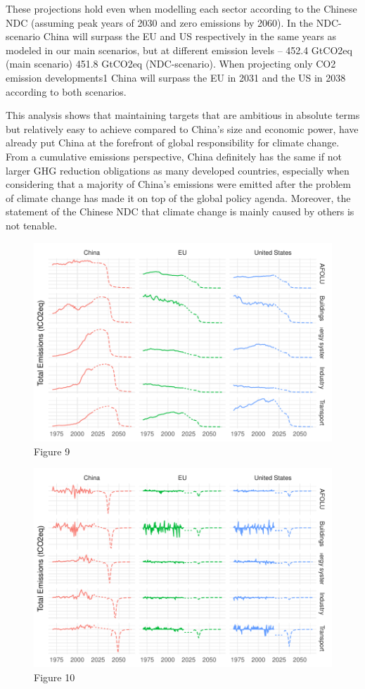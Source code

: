 \documentclass[
  12pt,
]{article}
\numberwithin{equation}{section}
\numberwithin{table}{section}
\numberwithin{figure}{section}
\begin{document}
These projections hold even when modelling each sector according to the
Chinese NDC (assuming peak years of 2030 and zero emissions by 2060). In
the NDC-scenario China will surpass the EU and US respectively in the
same years as modeled in our main scenarios, but at different emission
levels -- 452.4 GtCO2eq (main scenario) 451.8 GtCO2eq (NDC-scenario).
When projecting only CO2 emission developments1 China will surpass the
EU in 2031 and the US in 2038 according to both scenarios.

This analysis shows that maintaining targets that are ambitious in
absolute terms but relatively easy to achieve compared to China's size
and economic power, have already put China at the forefront of global
responsibility for climate change. From a cumulative emissions
perspective, China definitely has the same if not larger GHG reduction
obligations as many developed countries, especially when considering
that a majority of China's emissions were emitted after the problem of
climate change has made it on top of the global policy agenda. Moreover,
the statement of the Chinese NDC that climate change is mainly caused by
others is not tenable.

\begin{figure}
\centering
\includegraphics{Paper_files/figure-latex/unnamed-chunk-9-1.pdf}
\caption{Figure 9}
\end{figure}

\begin{figure}
\centering
\includegraphics{Paper_files/figure-latex/unnamed-chunk-10-1.pdf}
\caption{Figure 10}
\end{figure}
\end{document}
